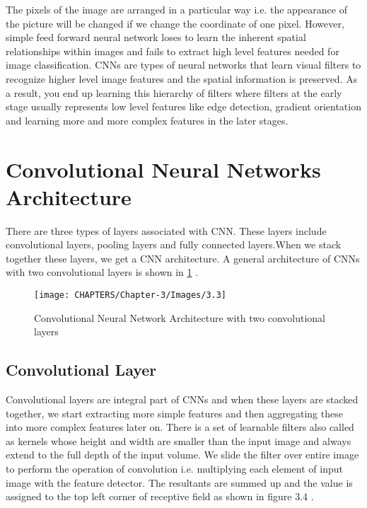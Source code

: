 The pixels of the image are arranged in a particular 
way i.e. the appearance of the picture will be changed 
if we change the coordinate of one pixel. However, simple feed 
forward neural network loses to learn the inherent spatial 
relationships within images and fails to extract high level features 
needed for image classification. CNNs are types 
of neural networks that learn visual filters to recognize higher level 
image features and the spatial information is preserved. As a result, you 
end up learning this hierarchy of filters where filters at the early stage 
usually represents low level features like edge detection, gradient orientation 
and learning more and more complex features in the later stages.

\section{Convolutional Neural Networks Architecture}

There are three types of layers associated with CNN. These layers include convolutional layers, pooling layers and fully connected layers.When we stack together these layers, we get a CNN architecture. A general
architecture of CNNs with two convolutional layers is shown in \ref{fig:3.3} \cite{chap_3_article:2}.

\begin{figure}[H]
	\centering
		\texttt{[image: CHAPTERS/Chapter-3/Images/3.3]}
	\caption{Convolutional Neural Network Architecture with two convolutional layers}
	\label{fig:3.3}
\end{figure}

\subsection{Convolutional Layer}
Convolutional layers are integral part of CNNs and when these layers are stacked
together, we start extracting more simple 
features and then aggregating these into more complex features later 
on. There is a set of learnable filters also called as kernels whose
height and width are smaller than the input image and always extend 
to the full depth of the input volume. We slide the filter over entire 
image to perform the operation of convolution i.e. multiplying each element of input image with the feature detector. The resultants are 
summed up and the value is assigned to the top left corner of receptive field 
as shown in figure 3.4 \cite{chap_3_article:4}.

